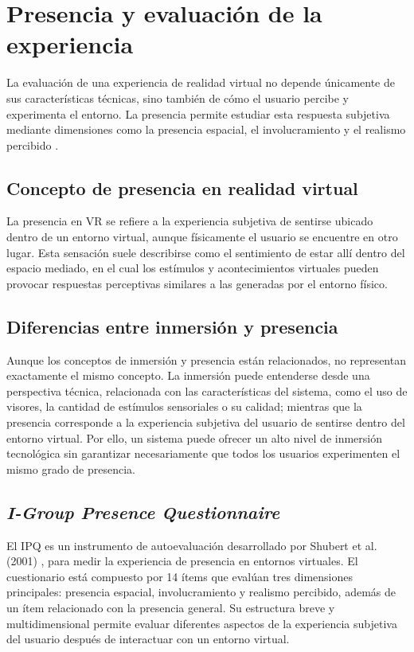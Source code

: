 % 
\section{Presencia y evaluación de la experiencia}
La evaluación de una experiencia de realidad virtual no depende únicamente de sus características técnicas, sino también de cómo el usuario percibe y experimenta el entorno. La presencia permite estudiar esta respuesta subjetiva mediante dimensiones como la presencia espacial, el involucramiento y el realismo percibido \cite{berkman2021igroup,castro2026immersive}.
\subsection{Concepto de presencia en realidad virtual}
La presencia en VR se refiere a la experiencia subjetiva de sentirse ubicado dentro de un entorno virtual, aunque físicamente el usuario se encuentre en otro lugar. Esta sensación suele describirse como el sentimiento de estar allí dentro del espacio mediado, en el cual los estímulos y acontecimientos virtuales pueden provocar respuestas perceptivas similares a las generadas por el entorno físico.
\subsection{Diferencias entre inmersión y presencia}
Aunque los conceptos de inmersión y presencia están relacionados, no representan exactamente el mismo concepto. La inmersión puede entenderse desde una perspectiva técnica, relacionada con las características del sistema, como el uso de visores, la cantidad de estímulos sensoriales o su calidad; mientras que la presencia corresponde a la experiencia subjetiva del usuario de sentirse dentro del entorno virtual. Por ello, un sistema puede ofrecer un alto nivel de inmersión tecnológica sin garantizar necesariamente que todos los usuarios experimenten el mismo grado de presencia.
\subsection{\emph{I-Group Presence Questionnaire}}
El IPQ es un instrumento de autoevaluación desarrollado por Shubert et al. (2001) \cite{schubert2001experience}, 
para medir la experiencia de presencia en entornos virtuales. El cuestionario está compuesto por 14 ítems que evalúan tres dimensiones principales: presencia espacial, involucramiento y realismo percibido, además de un ítem relacionado con la presencia general. Su estructura breve y multidimensional permite evaluar diferentes aspectos de la experiencia subjetiva del usuario después de interactuar con un entorno virtual.
